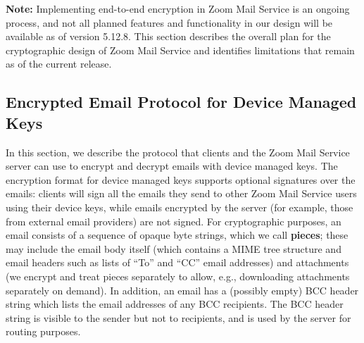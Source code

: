 \textbf{Note:} Implementing end-to-end encryption in Zoom Mail Service is an ongoing process, and
not all planned features and functionality in our design will be available as of version 5.12.8.
This section describes the overall plan for the cryptographic design of Zoom Mail Service and
identifies limitations that remain as of the current release.

\subsection{Encrypted Email Protocol for Device Managed Keys}
\label{subsec:emailprotocol}

In this section, we describe the protocol that clients and the Zoom Mail Service server can use to
encrypt and decrypt emails with device managed keys. The encryption format for device managed keys
supports optional signatures over the emails: clients will sign all the emails they send to other
Zoom Mail Service users using their device keys, while emails encrypted by the server (for example,
those from external email providers) are not signed. For cryptographic purposes, an email consists
of a sequence of opaque byte strings, which we call \textbf{pieces}; these may include the email
body itself (which contains a MIME tree structure and email headers such as lists of ``To'' and
``CC'' email addresses) and attachments (we encrypt and treat pieces separately to allow, e.g.,
downloading attachments separately on demand). In addition, an email has a (possibly empty) BCC
header string which lists the email addresses of any BCC recipients. The BCC header string is
visible to the sender but not to recipients, and is used by the server for routing purposes.

